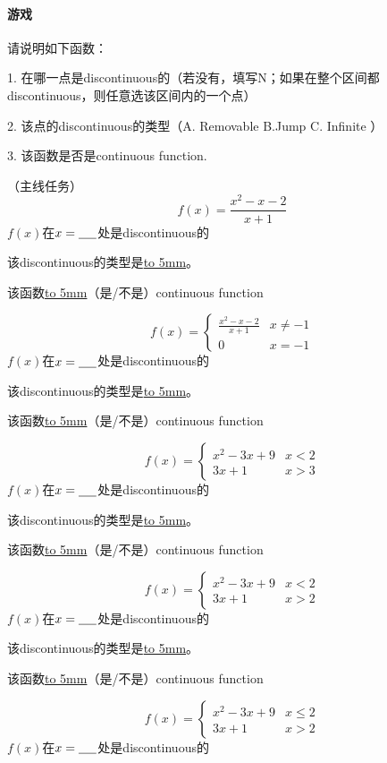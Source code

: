 \documentclass[UTF8]{ctexart}
\begin{document}
\paragraph{游戏}
请说明如下函数：

1. 在哪一点是discontinuous的（若没有，填写N；如果在整个区间都discontinuous，则任意选该区间内的一个点）

2. 该点的discontinuous的类型（A. Removable  B.Jump C. Infinite ）

3. 该函数是否是continuous function.

（主线任务）
\[f(x) = \frac{x^2-x-2}{x+1}\]
$f(x)$在$x = \underline{\hbox to 5mm{}}$处是discontinuous的

该discontinuous的类型是\underline{\hbox to 5mm{}}。

该函数\underline{\hbox to 5mm{}}（是/不是）continuous function

\[f(x) = 
\begin{cases}
\frac{x^2-x-2}{x+1} & x \neq -1\\
0 & x=-1
\end{cases}
\]
$f(x)$在$x = \underline{\hbox to 5mm{}}$处是discontinuous的

该discontinuous的类型是\underline{\hbox to 5mm{}}。

该函数\underline{\hbox to 5mm{}}（是/不是）continuous function

\[f(x) = 
\begin{cases}
x^2-3x+9 & x < 2\\
3x+1 & x > 3
\end{cases}
\]
$f(x)$在$x = \underline{\hbox to 5mm{}}$处是discontinuous的

该discontinuous的类型是\underline{\hbox to 5mm{}}。

该函数\underline{\hbox to 5mm{}}（是/不是）continuous function

\[f(x) = 
\begin{cases}
x^2-3x+9 & x < 2\\
3x+1 & x > 2
\end{cases}
\]
$f(x)$在$x = \underline{\hbox to 5mm{}}$处是discontinuous的

该discontinuous的类型是\underline{\hbox to 5mm{}}。

该函数\underline{\hbox to 5mm{}}（是/不是）continuous function

\[f(x) = 
\begin{cases}
x^2-3x+9 & x \leq 2\\
3x+1 & x > 2
\end{cases}
\]
$f(x)$在$x = \underline{\hbox to 5mm{}}$处是discontinuous的
\end{document}
